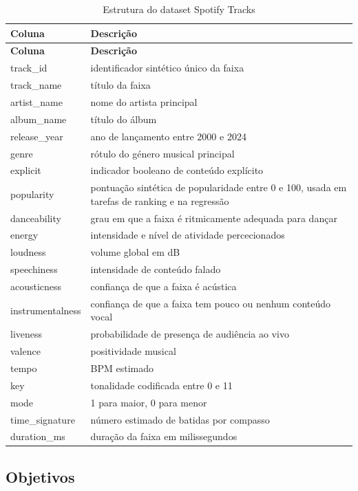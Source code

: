 \documentclass[11pt,a4paper]{article}
\newcommand{\code}[1]{{\ttfamily\hyphenchar\font=45\relax #1}}
\begin{document}
\begin{longtable}{p{3.2cm}p{9.1cm}}
\caption{Estrutura do dataset Spotify Tracks}\label{tab:estrutura_spotify}\\
\toprule
\textbf{Coluna} & \textbf{Descrição}\\
\midrule
\endfirsthead
\toprule
\textbf{Coluna} & \textbf{Descrição}\\
\midrule
\endhead
\code{track\_id} & identificador sintético único da faixa\\
\code{track\_name} & título da faixa\\
\code{artist\_name} & nome do artista principal\\
\code{album\_name} & título do álbum\\
\code{release\_year} & ano de lançamento entre 2000 e 2024\\
\code{genre} & rótulo do género musical principal\\
\code{explicit} & indicador booleano de conteúdo explícito\\
\code{popularity} & pontuação sintética de popularidade entre 0 e 100, usada em tarefas de ranking e na regressão\\
\code{danceability} & grau em que a faixa é ritmicamente adequada para dançar\\
\code{energy} & intensidade e nível de atividade percecionados\\
\code{loudness} & volume global em dB\\
\code{speechiness} & intensidade de conteúdo falado\\
\code{acousticness} & confiança de que a faixa é acústica\\
\code{instrumentalness} & confiança de que a faixa tem pouco ou nenhum conteúdo vocal\\
\code{liveness} & probabilidade de presença de audiência ao vivo\\
\code{valence} & positividade musical\\
\code{tempo} & BPM estimado\\
\code{key} & tonalidade codificada entre 0 e 11\\
\code{mode} & 1 para maior, 0 para menor\\
\code{time\_signature} & número estimado de batidas por compasso\\
\code{duration\_ms} & duração da faixa em milissegundos\\
\bottomrule
\end{longtable}

\subsection{Objetivos}
\end{document}
